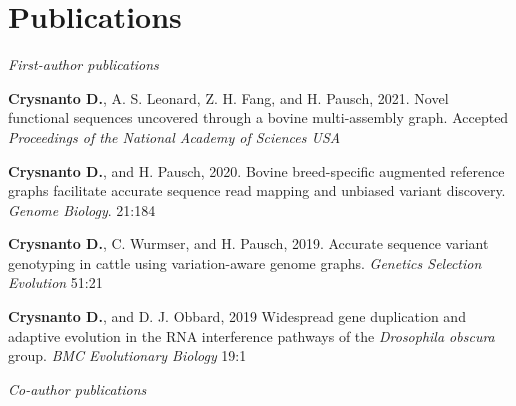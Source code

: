 \documentclass[letterpaper,10pt]{article}
\begin{document}
\section{Publications}
 \textit{First-author publications}
 \begin{enumerate}[leftmargin=0.3in]
    \small{\item{\textbf{Crysnanto D.}, A. S. Leonard, Z. H. Fang, and H. Pausch, 2021. Novel functional sequences uncovered through a bovine multi-assembly graph. Accepted \textit{Proceedings of the National Academy of Sciences USA}
    \item{\textbf{Crysnanto D.}, and H. Pausch, 2020. Bovine breed-specific augmented reference graphs facilitate accurate sequence read mapping and unbiased variant discovery. \textit{Genome Biology}. 21:184}
    \item{\textbf{Crysnanto D.}, C. Wurmser, and H. Pausch, 2019. Accurate sequence variant genotyping in cattle using variation-aware genome graphs. \textit{Genetics Selection Evolution} 51:21 }
    \item{\textbf{Crysnanto D.}, and D. J. Obbard, 2019 Widespread gene duplication and adaptive evolution in the RNA interference pathways of the \emph{Drosophila obscura} group. \textit{BMC Evolutionary Biology} 19:1}
    
}}
 \end{enumerate}
  \textit{Co-author publications}
\end{document}
